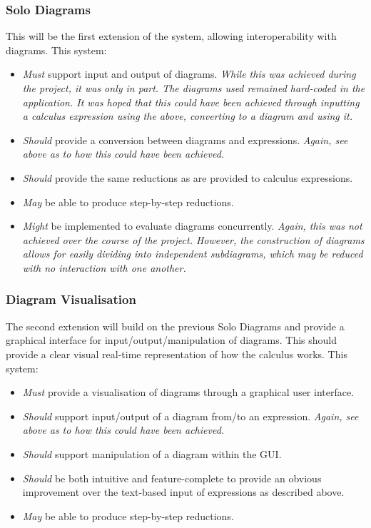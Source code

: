     \subsubsection{Solo Diagrams}
        This will be the first extension of the system, allowing interoperability with diagrams.
        This system:
        \begin{itemize}
            \item \textit{Must} support input and output of diagrams.
                \textit{While this was achieved during the project, it was only in part.
                The diagrams used remained hard-coded in the application.
                It was hoped that this could have been achieved through inputting a calculus expression using the above, converting to a diagram and using it.}
            \item \textit{Should} provide a conversion between diagrams and expressions.
                \textit{Again, see above as to how this could have been achieved.}
            \item \textit{Should} provide the same reductions as are provided to calculus expressions.
            \item \textit{May} be able to produce step-by-step reductions.
            \item \textit{Might} be implemented to evaluate diagrams concurrently.
                \textit{Again, this was not achieved over the course of the project.
                However, the construction of diagrams allows for easily dividing into independent subdiagrams, which may be reduced with no interaction with one another.}
        \end{itemize}

    \subsubsection{Diagram Visualisation}
        The second extension will build on the previous Solo Diagrams and provide a graphical interface for input/output/manipulation of diagrams.
        This should provide a clear visual real-time representation of how the calculus works.
        This system:
        \begin{itemize}
            \item \textit{Must} provide a visualisation of diagrams through a graphical user interface.
            \item \textit{Should} support input/output of a diagram from/to an expression.
                \textit{Again, see above as to how this could have been achieved.}
            \item \textit{Should} support manipulation of a diagram within the GUI.
            \item \textit{Should} be both intuitive and feature-complete to provide an obvious improvement over the text-based input of expressions as described above.
            \item \textit{May} be able to produce step-by-step reductions.
        \end{itemize}
